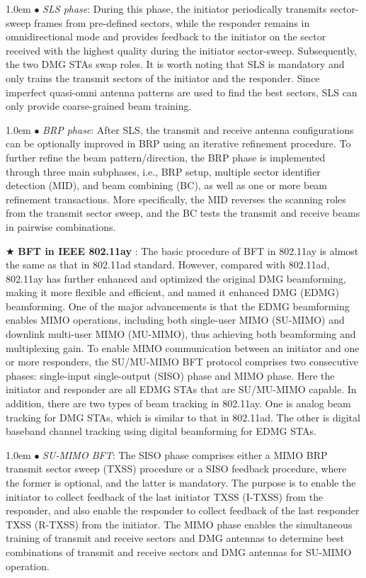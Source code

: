 \documentclass[journal,comsoc]{IEEEtran}
\begin{document}
\hangindent 1.0em
\noindent
$\bullet$ \emph{SLS phase}: During this phase, the initiator periodically transmits sector-sweep frames from pre-defined sectors, while the responder remains in omnidirectional mode and provides feedback to the initiator on the sector received with the highest quality during the initiator sector-sweep. Subsequently, the two DMG STAs swap roles. It is worth noting that SLS is mandatory and only trains the transmit sectors of the initiator and the responder. Since imperfect quasi-omni antenna patterns are used to find the best sectors, SLS can only provide coarse-grained beam training.


\hangindent 1.0em
\noindent
$\bullet$ \emph{BRP phase}: After SLS, the transmit and receive antenna configurations can be optionally improved in BRP using an iterative refinement procedure. To further refine the beam pattern/direction, the BRP phase is implemented through three main subphases, i.e., BRP setup, multiple sector identifier detection (MID), and beam combining (BC), as well as one or more beam refinement transactions. More specifically, the MID reverses the scanning roles from the transmit sector sweep, and the BC tests the transmit and receive beams in pairwise combinations.



$\bigstar$ \textbf{BFT in IEEE 802.11ay} \cite{IEEE-Std-802.11ay}: The basic procedure of BFT in 802.11ay is almost the same as that in 802.11ad standard. However, compared with 802.11ad, 802.11ay has further enhanced and optimized the original DMG beamforming, making it more flexible and efficient, and named it enhanced DMG (EDMG) beamforming. One of the major advancements is that the EDMG beamforming enables MIMO operations, including both single-user MIMO (SU-MIMO) and downlink multi-user MIMO (MU-MIMO), thus achieving both beamforming and multiplexing gain. To enable MIMO communication between an initiator and one or more responders, the SU/MU-MIMO BFT protocol comprises two consecutive phases: single-input single-output (SISO) phase and MIMO phase. Here the initiator and responder are all EDMG STAs that are SU/MU-MIMO capable. In addition, there are two types of beam tracking in 802.11ay. One is analog beam tracking for DMG STAs, which is similar to that in 802.11ad. The other is digital baseband channel tracking using digital beamforming for EDMG STAs.




\hangindent 1.0em
\noindent
$\bullet$ \emph{SU-MIMO BFT}: The SISO phase comprises either a MIMO BRP transmit sector sweep (TXSS) procedure or a SISO feedback procedure, where the former is optional, and the latter is mandatory. The purpose is to enable the initiator to collect feedback of the last initiator TXSS (I-TXSS) from the responder, and also enable the responder to collect feedback of the last responder TXSS (R-TXSS) from the initiator. The MIMO phase enables the
simultaneous training of transmit and receive sectors and DMG antennas to determine best combinations of transmit and receive sectors and DMG antennas for SU-MIMO operation.
\end{document}
